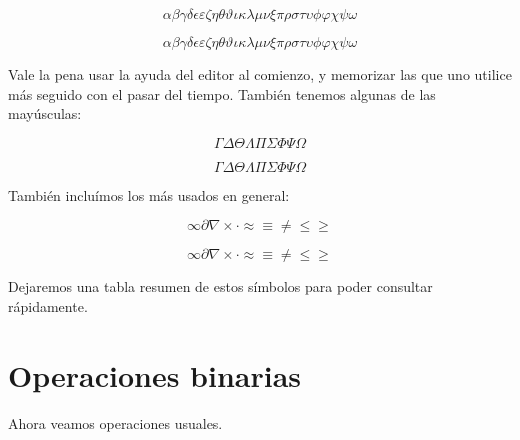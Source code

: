 \documentclass[graybox,envcountchap,sectrefs]{svmono}
\begin{document}
    \begin{code}\[
        \alpha \beta \gamma \delta \epsilon \varepsilon \zeta \eta \theta \vartheta \iota \kappa \lambda \mu \nu \xi \pi \rho \sigma \tau \upsilon \phi \varphi \chi \psi \omega
    \]
    \end{code}

    \begin{compiled}
        \[
        \alpha \beta \gamma \delta \epsilon \varepsilon \zeta \eta \theta \vartheta \iota \kappa \lambda \mu \nu \xi \pi \rho \sigma \tau \upsilon \phi \varphi \chi \psi \omega
    \]
    \end{compiled}
    Vale la pena usar la ayuda del editor al comienzo, y memorizar las que uno utilice más seguido con el pasar del tiempo.
    También tenemos algunas de las mayúsculas:
    \begin{code}
        \[\Gamma \Delta \Theta \Lambda \Pi \Sigma \Phi \Psi \Omega\]
    \end{code}
    \begin{compiled}
        \[\Gamma \Delta \Theta \Lambda \Pi \Sigma \Phi \Psi \Omega\]
    \end{compiled}

    También incluímos los más usados en general:
    \begin{code}\[
        \infty \partial \nabla \times \cdot \approx \equiv \neq \leq \geq
    \]
    \end{code}
    \begin{compiled}
        \[
        \infty \partial \nabla \times \cdot \approx \equiv \neq \leq \geq
    \]
    \end{compiled}

    Dejaremos una tabla resumen de estos símbolos para poder consultar rápidamente. %

    \section{Operaciones binarias}
    Ahora veamos operaciones usuales.
\end{document}
